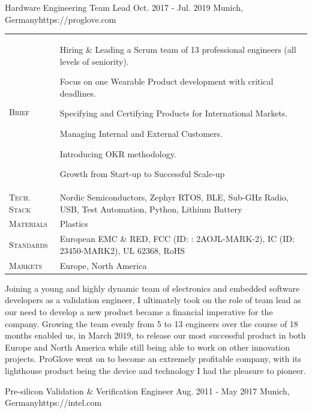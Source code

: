 \documentclass[10pt,a4paper]{moderncv}
\begin{document}
\clearpage
{}
  {Hardware Engineering Team Lead}
  {Oct. 2017 - Jul. 2019}
  {Munich, Germany}{https://proglove.com}

  \begin{tabularx}{\textwidth}{>{\scshape}l@{\hskip 3.5mm}L}
    Brief & Hiring \& Leading a Scrum team of 13 professional engineers (all levels of seniority).
    \par Focus on one Wearable Product development with critical deadlines.
    \par Specifying and Certifying Products for International Markets.
    \par Managing Internal and External Customers. 
    \par Introducing OKR methodology.
    \par Growth from Start-up to Successful Scale-up\\
    Tech. Stack & Nordic Semiconductors, Zephyr RTOS, BLE, Sub-GHz Radio, USB, Test Automation, Python, Lithium Battery\\
    Materials & Plastics\\
    Standards & European EMC \& RED, FCC (ID: : 2AOJL-MARK-2), IC (ID: 23450-MARK2), UL 62368, RoHS\\
    Markets & Europe, North America\\
  \end{tabularx}

  \vspace{1.5em}
  
  \begin{minipage}{\textwidth}
    \small
    Joining a young and highly dynamic team of electronics and embedded software developers as a validation engineer, I ultimately took on the role of team lead as our need to develop a new product became a financial imperative for the company. Growing the team evenly from 5 to 13 engineers over the course of 18 months enabled us, in March 2019, to release our most successful product in both Europe and North America while still being able to work on other innovation projects. ProGlove went on to become an extremely profitable company, with its lighthouse product being the device and technology I had the pleasure to pioneer.
  \end{minipage}

  \vspace{1.5em}

  {Pre-silicon Validation \& Verification Engineer}
  {Aug. 2011 - May 2017}
  {Munich, Germany}{https://intel.com}
\end{document}
